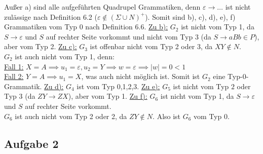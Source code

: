 \begin{lösung}
	Außer a) sind alle aufgeführten Quadrupel Grammatiken, denn $\varepsilon\to\ldots$ ist nicht zulässige nach Definition 6.2 ($\varepsilon\not\in(\Sigma\cup N)^+$).
	Somit sind b), c), d), e), f) Grammatiken vom Typ 0 nach Definition 6.6.\nl
	\underline{Zu b):}
	$G_2$ ist nicht vom Typ 1, da $S\to\varepsilon$ und $S$ auf rechter Seite vorkommt und nicht vom Typ 3 (da $S\to aBb\in P$), aber vom Typ 2.\nl
	\underline{Zu c):}
	$G_3$ ist offenbar nicht vom Typ 2 oder 3, da $XY\not\in N$.\\
	$G_2$ ist auch nicht vom Typ 1, denn:\\
	\underline{Fall 1:} $X=A\implies u_1=\varepsilon,u_2=Y\implies w=\varepsilon\implies |w|=0<1$\\
	\underline{Fall 2:} $Y=A\implies u_1=X$, was auch nicht möglich ist.
	Somit ist $G_2$ eine Typ-0-Grammatik.\nl
	\underline{Zu d):}
	$G_4$ ist vom Typ 0,1,2,3.\nl
	\underline{Zu e):}
	$G_5$ ist nicht vom Typ $2$ oder Typ 3 (da $ZY\to ZX$), aber vom Typ 1.\nl
	\underline{Zu f):}
	$G_6$ ist nicht vom Typ 1, da $S\to\varepsilon$ und $S$ auf rechter Seite vorkommt.\\
	$G_6$ ist auch nicht vom Typ 2 oder 2, da $ZY\not\in N$.
	Also ist $G_6$ vom Typ 0.
\end{lösung}

\subsection{Aufgabe 2}

